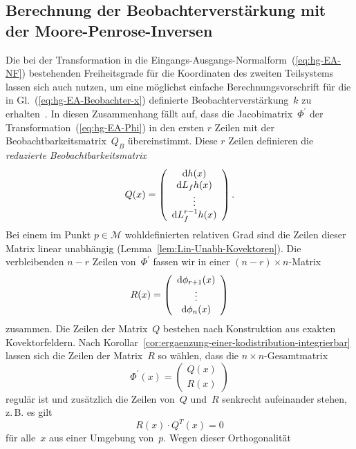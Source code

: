 \subsection{Berechnung der Beobachterverstärkung mit der Moore-Penrose-Inversen}

Die bei der Transformation in die Eingangs-Ausgangs-Normalform~(\ref{eq:hg-EA-NF})
bestehenden Freiheitsgrade für die Koordinaten des zweiten Teilsystems
lassen sich auch nutzen, um eine möglichst einfache Berechnungsvorschrift
für die in Gl.~(\ref{eq:hg-EA-Beobachter-x}) definierte Beobachterverstärkung~$k$
zu erhalten~\cite{roebenack2004at,roebenack2007ndst}. In diesen
Zusammenhang fällt auf, dass die Jacobimatrix~$\Phi^{\prime}$ der
Transformation~(\ref{eq:hg-EA-Phi}) in den ersten $r$ Zeilen mit
der Beobachtbarkeitsmatrix~$Q_{B}$ übereinstimmt. Diese $r$ Zeilen
definieren die \emph{reduzierte} \emph{Beobachtbarkeitsmatrix}
\[
Q(x)=\left(\begin{array}{c}
{\mathrm{d}} h(x)\\
{\mathrm{d}} L_{f}h(x)\\
\vdots\\
{\mathrm{d}} L_{f}^{r-1}h(x)
\end{array}\right).
\]
Bei einem im Punkt $p\in\mathcal{M}$ wohldefinierten relativen Grad
sind die Zeilen dieser Matrix linear unabhängig (Lemma~\ref{lem:Lin-Unabh-Kovektoren}).
Die verbleibenden $n-r$ Zeilen von~$\Phi^{\prime}$ fassen wir in
einer $(n-r)\times n$-Matrix
\[
R(x)=\left(\begin{array}{c}
{\mathrm{d}}\phi_{r+1}(x)\\
\vdots\\
{\mathrm{d}}\phi_{n}(x)
\end{array}\right)
\]
zusammen. Die Zeilen der Matrix~$Q$ bestehen nach Konstruktion aus
exakten Kovektorfeldern. Nach Korollar~\ref{cor:ergaenzung-einer-kodistribution-integrierbar}
lassen sich die Zeilen der Matrix~$R$ so wählen, dass die $n\times n$-Gesamtmatrix
\begin{equation}
\Phi^{\prime}(x)=\left(\begin{array}{c}
Q(x)\\
R(x)
\end{array}\right)\label{eq:hg-EA-QR-Jac}
\end{equation}
regulär ist und zusätzlich die Zeilen von~$Q$ und~$R$ senkrecht
aufeinander stehen, z.\,B. es gilt 
\begin{equation}
R(x)\cdot Q^{T}(x)=0\label{eq:hg-EA-QR-orth}
\end{equation}
für alle~$x$ aus einer Umgebung von~$p$. Wegen dieser Orthogonalität
